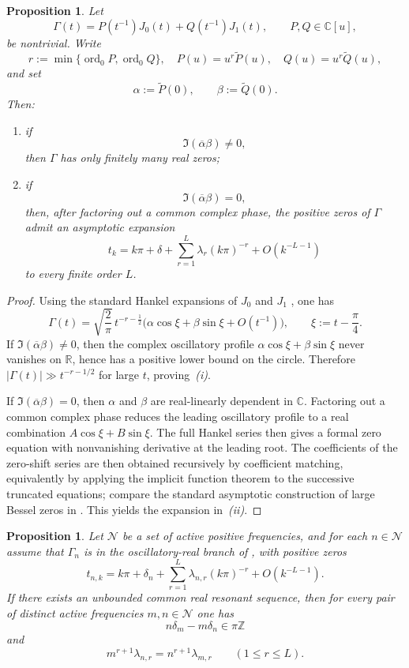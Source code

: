 \documentclass[11pt,reqno]{amsart}
\newtheorem{proposition}[theorem]{Proposition}
\theoremstyle{definition}
\newcommand{\R}{\mathbb{R}}
\newcommand{\C}{\mathbb{C}}
\newcommand{\Z}{\mathbb{Z}}
\newcommand{\abs}[1]{\left\lvert #1 \right\rvert}
\begin{document}
\begin{proposition}\label{prop:one-frequency-geometry}
Let
\[
\Gamma(t)=P(t^{-1})J_0(t)+Q(t^{-1})J_1(t),
\qquad
P,Q\in\C[u],
\]
be nontrivial. Write
\[
r:=\min\{\operatorname{ord}_0 P,\operatorname{ord}_0 Q\},
\quad
P(u)=u^r\widetilde P(u),
\quad
Q(u)=u^r\widetilde Q(u),
\]
and set
\[
\alpha:=\widetilde P(0),\qquad \beta:=\widetilde Q(0).
\]
Then:
\begin{enumerate}[label=\emph{(\roman*)}]
\item if
\[
\Im(\overline\alpha\beta)\neq 0,
\]
then $\Gamma$ has only finitely many real zeros;
\item if
\[
\Im(\overline\alpha\beta)=0,
\]
then, after factoring out a common complex phase, the positive zeros of $\Gamma$ admit an
asymptotic expansion
\[
t_k
=
k\pi+\delta+\sum_{r=1}^L \lambda_r(k\pi)^{-r}+O(k^{-L-1})
\]
to every finite order $L$.
\end{enumerate}
\end{proposition}

\begin{proof}
Using the standard Hankel expansions of $J_0$ and $J_1$
\cite[\S10.17,\S10.20]{DLMF}, one has
\[
\Gamma(t)
=
\sqrt{\frac{2}{\pi}}\,t^{-r-\frac12}
\bigl(\alpha\cos\xi+\beta\sin\xi+O(t^{-1})\bigr),
\qquad
\xi:=t-\frac{\pi}{4}.
\]
If $\Im(\overline\alpha\beta)\neq 0$, then the complex oscillatory profile
$\alpha\cos\xi+\beta\sin\xi$ never vanishes on $\R$, hence has a positive lower bound on the
circle. Therefore $\abs{\Gamma(t)}\gg t^{-r-1/2}$ for large $t$, proving~\emph{(i)}.

If $\Im(\overline\alpha\beta)=0$, then $\alpha$ and $\beta$ are real-linearly dependent in
$\C$. Factoring out a common complex phase reduces the leading oscillatory profile to a real
combination $A\cos\xi+B\sin\xi$. The full Hankel series then gives a formal zero equation with
nonvanishing derivative at the leading root. The coefficients of the zero-shift series are then
obtained recursively by coefficient matching, equivalently by applying the implicit function
theorem to the successive truncated equations; compare the standard asymptotic construction of
large Bessel zeros in \cite[\S10.21]{DLMF}. This yields the expansion in~\emph{(ii)}.
\end{proof}

\begin{proposition}\label{prop:compatibility-hierarchy-paper}
Let $\mathcal N$ be a set of active positive frequencies, and for each $n\in\mathcal N$ assume
that $\Gamma_n$ is in the oscillatory-real branch of , with
positive zeros
\[
t_{n,k}
=
k\pi+\delta_n+\sum_{r=1}^L \lambda_{n,r}(k\pi)^{-r}+O(k^{-L-1}).
\]
If there exists an unbounded common real resonant sequence, then for every pair of distinct
active frequencies $m,n\in\mathcal N$ one has
\[
n\delta_m-m\delta_n\in\pi\Z
\]
and
\[
m^{r+1}\lambda_{n,r}=n^{r+1}\lambda_{m,r}
\qquad (1\le r\le L).
\]
\end{proposition}
\end{document}
